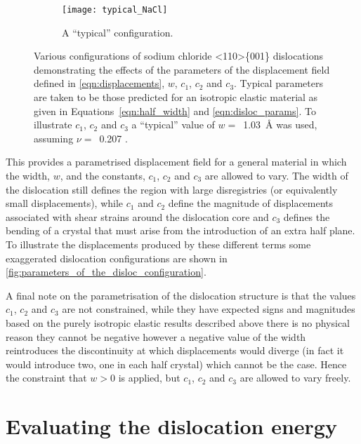 \begin{figure}
    \begin{subfigure}{0.8\textwidth}
    \centering
    \texttt{[image: typical\_NaCl]}
    \caption{A ``typical'' configuration.}
    \end{subfigure}

\caption{Various configurations of sodium chloride <110>\{001\} dislocations demonstrating the effects of the parameters of the displacement field defined in \autoref{eqn:displacements}, $w$, $c_1$, $c_2$ and $c_3$. Typical parameters are taken to be those predicted for an isotropic elastic material as given in  Equations~\ref{eqn:half_width} and \ref{eqn:disloc_params}. To illustrate $c_1$, $c_2$ and $c_3$ a ``typical'' value of $w=$~\SI{1.03}{\angstrom} was used, assuming $\nu =$~\num{0.207} \cite{Theocaris1994}.\label{fig:parameters_of_the_disloc_configuration}}
\end{figure}


This provides a parametrised displacement field for a general material in which the width, $w$, and the constants, $c_1$, $c_2$ and $c_3$ are allowed to vary. The width of the dislocation still defines the region with large disregistries (or equivalently small displacements), while $c_1$ and $c_2$ define the magnitude of displacements associated with shear strains around the dislocation core and $c_3$ defines the bending of a crystal that must arise from the introduction of an extra half plane.
To illustrate the displacements produced by these different terms some exaggerated dislocation configurations are shown in \autoref{fig:parameters_of_the_disloc_configuration}.





A final note on the parametrisation of the dislocation structure is that the values $c_1$, $c_2$ and $c_3$ are not constrained, while they have expected signs and magnitudes based on the purely isotropic elastic results described above there is no physical reason they cannot be negative however a negative value of the width reintroduces the discontinuity at which displacements would diverge (in fact it would introduce two, one in each half crystal) which cannot be the case. Hence the constraint that $w>0$ is applied, but $c_1$, $c_2$ and $c_3$ are allowed to vary freely.


\section{Evaluating the dislocation energy}




